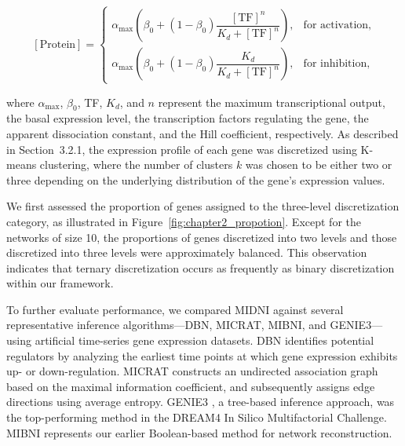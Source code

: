 \[
[\text{Protein}] =
\begin{cases}
\alpha_{\max} \left( \beta_0 + (1 - \beta_0)\dfrac{[\text{TF}]^n}{K_d + [\text{TF}]^n} \right), & \text{for activation}, \\[10pt]
\alpha_{\max} \left( \beta_0 + (1 - \beta_0)\dfrac{K_d}{K_d + [\text{TF}]^n} \right), & \text{for inhibition},
\end{cases}
\]

where $\alpha_{\max}$, $\beta_0$, TF, $K_d$, and $n$ represent the maximum transcriptional output, the basal expression level, the transcription factors regulating the gene, the apparent dissociation constant, and the Hill coefficient, respectively. As described in Section~3.2.1, the expression profile of each gene was discretized using K-means clustering, where the number of clusters $k$ was chosen to be either two or three depending on the underlying distribution of the gene’s expression values.

We first assessed the proportion of genes assigned to the three-level discretization category, as illustrated in Figure~\ref{fig:chapter2_propotion}. Except for the networks of size 10, the proportions of genes discretized into two levels and those discretized into three levels were approximately balanced. This observation indicates that ternary discretization occurs as frequently as binary discretization within our framework.

To further evaluate performance, we compared MIDNI against several representative inference algorithms—DBN, MICRAT, MIBNI, and GENIE3—using artificial time-series gene expression datasets. DBN \parencite{Zou2005} identifies potential regulators by analyzing the earliest time points at which gene expression exhibits up- or down-regulation. MICRAT \parencite{Yang2018} constructs an undirected association graph based on the maximal information coefficient, and subsequently assigns edge directions using average entropy. GENIE3 \parencite{huynhthu2010}, a tree-based inference approach, was the top-performing method in the DREAM4 In Silico Multifactorial Challenge. MIBNI represents our earlier Boolean-based method for network reconstruction.

